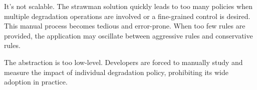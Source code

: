 
It's not scalable. The strawman solution quickly leads to too many policies when
multiple degradation operations are involved or a fine-grained control is
desired. This manual process becomes tedious and error-prone. When too few rules
are provided, the application may oscillate between aggressive rules and
conservative rules.

The abstraction is too low-level. Developers are forced to manually study and
measure the impact of individual degradation policy, prohibiting its wide
adoption in practice.

